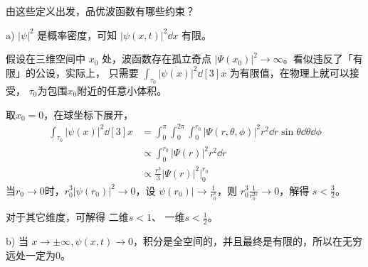 由这些定义出发，品优波函数有哪些约束？

a) $|\psi|^2$ 是概率密度，可知 $|\psi(x,t)|^2 \dd x$ 有限。

{
    假设在三维空间中 $x_0 $ 处，波函数存在孤立奇点 $ |\Psi(x_0)|^2 \rightarrow \infty $。看似违反了「有限」的公设，实际上，
	只需要 $\int_{\tau_0} |\psi(x)|^2 \dd[3] x$ 为有限值，在物理上就可以接受，
	$ \tau_0 $为包围$ x_0 $附近的任意小体积。
	
	取$ x_0 = 0 $，在球坐标下展开，
	\begin{align}
	\int_{\tau_0} |\psi(x)|^2 \dd[3] x &= \int_0^\pi \int_0^{2\pi} \int_0^{r_0} |\Psi(r,\theta,\phi)|^2 r^2\dd r \sin\theta\dd\theta \dd\phi \\
	&\propto \int_0^{r_0} |\Psi(r)|^2 r^2 \dd r \\
	&\propto \frac{r^3}{3} |\Psi(r)|^2 \Big|_0^{r_0}
	\end{align}
	当$ r_0 \rightarrow 0 $时，$r_0^3 |\psi(r_0)|^2 \rightarrow 0$，设 $\psi(r_0)| \rightarrow \frac1{r_0^s}$，则 $r_0^3 \frac{1}{r_0^{2s}} \rightarrow 0$，解得 $s < \frac32$。

    对于其它维度，可解得 二维$ s < 1 $、 一维$ s < \frac{1}{2} $。
}

b) 当 $x\rightarrow\pm\infty, \psi(x,t)\rightarrow0$，积分是全空间的，并且最终是有限的，所以在无穷远处一定为0。

